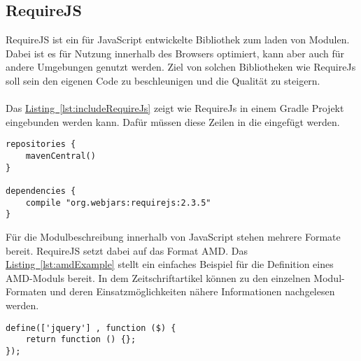 \subsection{RequireJS}\label{sec:requireJs}
RequireJS \cite{requirejs} ist ein für JavaScript entwickelte Bibliothek zum laden von Modulen. Dabei ist es für Nutzung innerhalb des Browsers optimiert, kann aber auch für andere Umgebungen genutzt werden. Ziel von solchen Bibliotheken wie RequireJs soll sein den eigenen Code zu beschleunigen und die Qualität zu steigern.\\
\\
Das \hyperref[lst:includeRequireJs]{Listing~\ref{lst:includeRequireJs}} zeigt wie RequireJs in einem Gradle Projekt eingebunden werden kann. Dafür müssen diese Zeilen in die  eingefügt werden.
\begin{lstlisting}[style=lstStyleFramed, language=Gradle, caption={Einbindung der Bibliothek RequireJs mithilfe von Gradle}, label=lst:includeRequireJs, float]
repositories {
	mavenCentral()
}

dependencies {
	compile "org.webjars:requirejs:2.3.5"
}
\end{lstlisting}
Für die Modulbeschreibung innerhalb von JavaScript stehen mehrere Formate bereit. RequireJS setzt dabei auf das Format \gls{AMD}. Das \hyperref[lst:amdExample]{Listing~\ref{lst:amdExample}} stellt ein einfaches Beispiel für die Definition eines \gls{AMD}-Moduls bereit. In dem Zeitschriftartikel \cite{jsModuleDefinitions} können zu den einzelnen Modul-Formaten und deren Einsatzmöglichkeiten nähere Informationen nachgelesen werden.
\begin{lstlisting}[style=lstStyleFramed, caption={Beispiel: Moduldefinition mittels \acrfull{AMD} \cite{requirejsExample}}, label=lst:amdExample]
define(['jquery'] , function ($) {
	return function () {};
});
\end{lstlisting}

